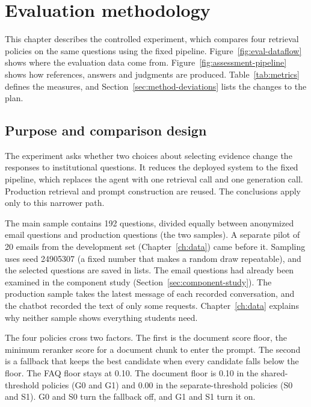 \section{Evaluation methodology}
\label{ch:methodology}

This chapter describes the controlled experiment, which compares four retrieval policies on the same questions using the fixed pipeline. Figure~\ref{fig:eval-dataflow} shows where the evaluation data come from. Figure~\ref{fig:assessment-pipeline} shows how references, answers and judgments are produced. Table~\ref{tab:metrics} defines the measures, and Section~\ref{sec:method-deviations} lists the changes to the plan.



\subsection{Purpose and comparison design}

The experiment asks whether two choices about selecting evidence change the responses to institutional questions. It reduces the deployed system to the fixed pipeline, which replaces the agent with one retrieval call and one generation call. Production retrieval and prompt construction are reused. The conclusions apply only to this narrower path.

The main sample contains 192 questions, divided equally between anonymized email questions and production questions (the two samples). A separate pilot of 20 emails from the development set (Chapter~\ref{ch:data}) came before it. Sampling uses seed 24905307 (a fixed number that makes a random draw repeatable), and the selected questions are saved in lists. The email questions had already been examined in the component study (Section~\ref{sec:component-study}). The production sample takes the latest message of each recorded conversation, and the chatbot recorded the text of only some requests. Chapter~\ref{ch:data} explains why neither sample shows everything students need.

The four policies cross two factors. The first is the document score floor, the minimum reranker score for a document chunk to enter the prompt. The second is a fallback that keeps the best candidate when every candidate falls below the floor. The FAQ floor stays at 0.10. The document floor is 0.10 in the shared-threshold policies (G0 and G1) and 0.00 in the separate-threshold policies (S0 and S1). G0 and S0 turn the fallback off, and G1 and S1 turn it on.

